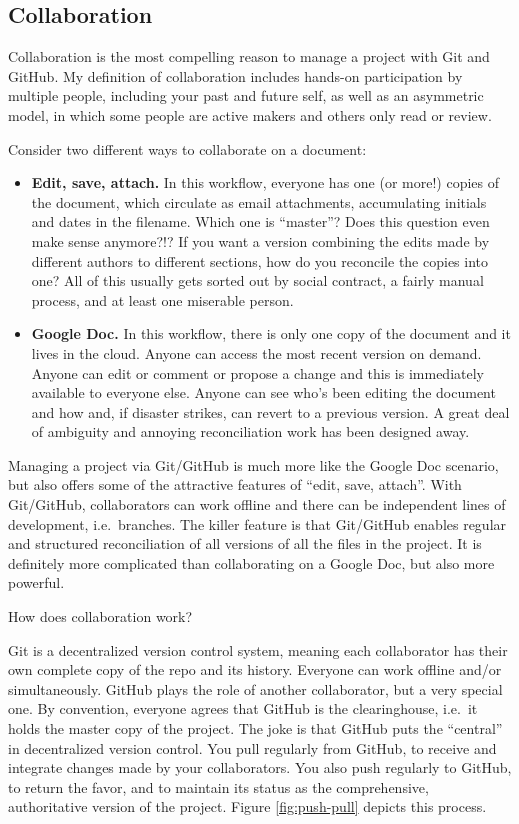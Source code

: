 \documentclass[12pt]{article}
\begin{document}
\subsection{Collaboration}\label{collaboration}

Collaboration is the most compelling reason to manage a project with Git
and GitHub. My definition of collaboration includes hands-on
participation by multiple people, including your past and future self,
as well as an asymmetric model, in which some people are active makers
and others only read or review.

Consider two different ways to collaborate on a document:

\begin{itemize}
\item
  \textbf{Edit, save, attach.} In this workflow, everyone has one (or
  more!) copies of the document, which circulate as email attachments,
  accumulating initials and dates in the filename. Which one is
  ``master''? Does this question even make sense anymore?!? If you want
  a version combining the edits made by different authors to different
  sections, how do you reconcile the copies into one? All of this
  usually gets sorted out by social contract, a fairly manual process,
  and at least one miserable person.
\item
  \textbf{Google Doc.} In this workflow, there is only one copy of the
  document and it lives in the cloud. Anyone can access the most recent
  version on demand. Anyone can edit or comment or propose a change and
  this is immediately available to everyone else. Anyone can see who's
  been editing the document and how and, if disaster strikes, can revert
  to a previous version. A great deal of ambiguity and annoying
  reconciliation work has been designed away.
\end{itemize}

Managing a project via Git/GitHub is much more like the Google Doc
scenario, but also offers some of the attractive features of ``edit,
save, attach''. With Git/GitHub, collaborators can work offline and
there can be independent lines of development, i.e.~branches. The killer
feature is that Git/GitHub enables regular and structured reconciliation
of all versions of all the files in the project. It is definitely more
complicated than collaborating on a Google Doc, but also more powerful.

How does collaboration work?

Git is a decentralized version control system, meaning each collaborator
has their own complete copy of the repo and its history. Everyone can
work offline and/or simultaneously. GitHub plays the role of another
collaborator, but a very special one. By convention, everyone agrees
that GitHub is the clearinghouse, i.e.~it holds the master copy of the
project. The joke is that GitHub puts the ``central'' in decentralized
version control. You pull regularly from GitHub, to receive and
integrate changes made by your collaborators. You also push regularly to
GitHub, to return the favor, and to maintain its status as the
comprehensive, authoritative version of the project. Figure
\ref{fig:push-pull} depicts this process.
\end{document}
